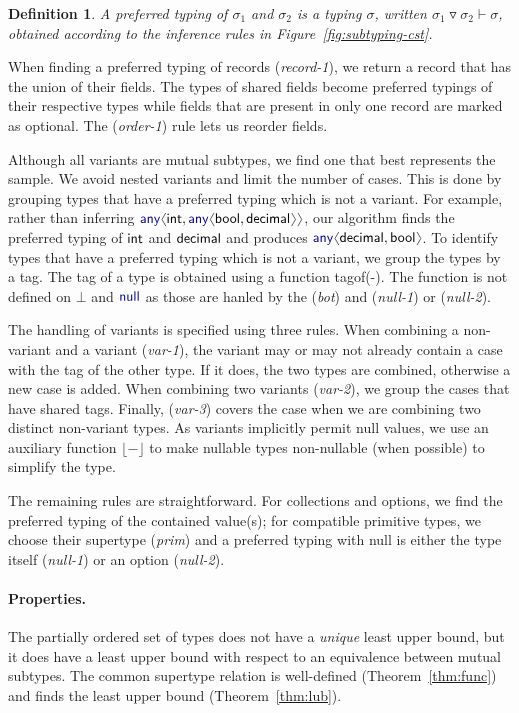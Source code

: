\documentclass[10pt,preprint,blind,clearpagebib]{sigplanconf}
\newcommand{\langl}{\begin{picture}(4.5,7)
\put(1.1,2.5){\rotatebox{60}{\line(1,0){5.5}}}
\put(1.1,2.5){\rotatebox{300}{\line(1,0){5.5}}}
\end{picture}}
\newcommand{\rangl}{\begin{picture}(4.5,7)
\put(.9,2.5){\rotatebox{120}{\line(1,0){5.5}}}
\put(.9,2.5){\rotatebox{240}{\line(1,0){5.5}}}
\end{picture}}
\newcommand{\kvd}[1]{\textnormal{\textcolor{kvdclr}{\sffamily #1}}}
\newcommand{\ident}[1]{\textnormal{\sffamily #1}}
\newcommand{\dropopt}[1]{\lfloor#1\rfloor}
\newcommand{\tytagof}{\ident{tagof}}
\newtheorem{definition}{Definition}
\begin{document}
\begin{definition}
A \emph{preferred typing} of $\sigma_1$ and $\sigma_2$ is a typing $\sigma$, written 
$\sigma_1 \triangledown \sigma_2 \vdash \sigma$, obtained according to the inference rules in 
Figure~\ref{fig:subtyping-cst}.
\end{definition}

\noindent
When finding a preferred typing of records (\emph{record-1}), we return a record that has the 
union of their fields. The types of shared fields become preferred typings of their respective 
types while fields that are present in only one record are marked as optional. The (\emph{order-1})
rule lets us reorder fields.

Although all variants are mutual subtypes, we find one that best represents the sample. We avoid
nested variants and limit the number of cases. This is done by grouping types 
that have a preferred typing which is not a variant. For example, rather than inferring 
$\kvd{any}\langl\ident{int}, \kvd{any}\langl\ident{bool}, \ident{decimal}\rangl\rangl$, 
our algorithm finds the preferred typing of $\ident{int}$ and $\ident{decimal}$ and produces 
$\kvd{any}\langl\ident{decimal},\ident{bool}\rangl$. To identify types that have a preferred typing 
which is not a variant, we group the types by a tag. The tag of a type is obtained using a function 
\tytagof{(-)}. The function is not defined on $\bot$ and $\kvd{null}$ as those are hanled by the 
(\emph{bot}) and (\emph{null-1}) or (\emph{null-2}).

The handling of variants is specified using three rules. When combining a non-variant and a
variant (\emph{var-1}), the variant may or may not already contain a case with the tag of the other
type. If it does, the two types are combined, otherwise a new case is added.
When combining two variants (\emph{var-2}), we group the cases that have shared tags.
Finally, (\emph{var-3}) covers the case when we are combining two distinct non-variant types.
As variants implicitly permit \kvd{null} values, we use an auxiliary function $\dropopt{-}$ to
make nullable types non-nullable (when possible) to simplify the type.

The remaining rules are straightforward. For collections and options, we find the preferred typing 
of the contained value(s); for compatible primitive types, we choose their supertype (\emph{prim})
and a preferred typing with \kvd{null} is either the type itself (\emph{null-1}) or an option 
(\emph{null-2}).

\paragraph{Properties.}
The partially ordered set of types does not have a \emph{unique} least upper bound, but it does 
have a least upper bound with respect to an equivalence between mutual subtypes. The common 
supertype relation is well-defined (Theorem~\ref{thm:func}) and finds the least upper bound 
(Theorem~\ref{thm:lub}). 
\end{document}
